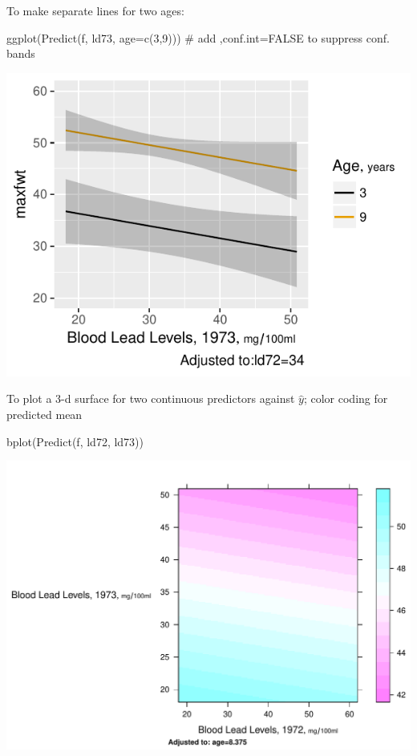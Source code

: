 \item To make separate lines for two ages: \ipacue
\begin{Schunk}
\begin{Sinput}
ggplot(Predict(f, ld73, age=c(3,9)))  # add ,conf.int=FALSE to suppress conf. bands
\end{Sinput}


\centerline{\includegraphics[width=\maxwidth]{rmsintro-unnamed-chunk-15-1} }

\end{Schunk}
\item To plot a 3-d surface for two continuous predictors against
  $\hat{y}$; color coding for predicted mean  \ipacue
\begin{Schunk}
\begin{Sinput}
bplot(Predict(f, ld72, ld73))
\end{Sinput}


\centerline{\includegraphics[width=\maxwidth]{rmsintro-unnamed-chunk-16-1} }

\end{Schunk}
\ei

